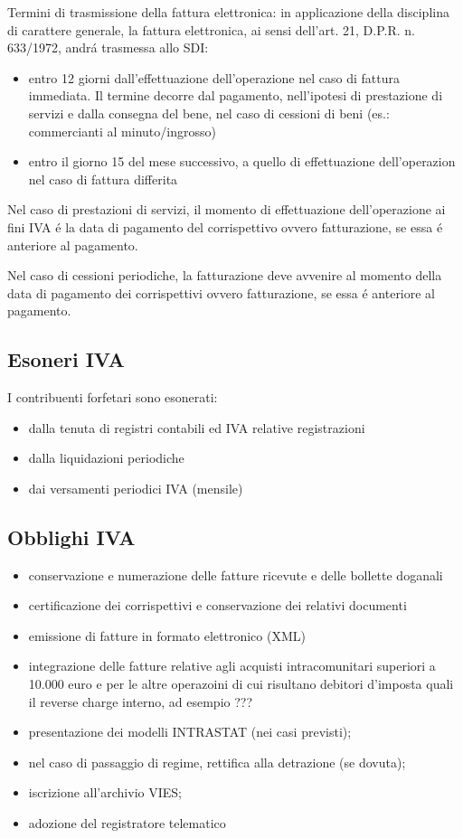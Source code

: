 \documentclass{article}
\begin{document}
Termini di trasmissione della fattura elettronica: in applicazione della disciplina di carattere generale, la fattura elettronica, ai sensi dell'art. 21, D.P.R. n. 633/1972, andr\'a trasmessa allo SDI:

\begin{itemize}
    \item entro 12 giorni dall'effettuazione dell'operazione nel caso di fattura immediata. Il termine decorre dal pagamento, nell'ipotesi di prestazione di servizi e dalla consegna del bene, nel caso di cessioni di beni (es.: commercianti al minuto/ingrosso)
    \item entro il giorno 15 del mese successivo, a quello di effettuazione dell'operazion nel caso di fattura differita
\end{itemize}

Nel caso di prestazioni di servizi, il momento di effettuazione dell'operazione ai fini IVA \'e la data di pagamento del corrispettivo ovvero fatturazione, se essa \'e anteriore al pagamento.

Nel caso di cessioni periodiche, la fatturazione deve avvenire al momento della data di pagamento dei corrispettivi ovvero fatturazione, se essa \'e anteriore al pagamento.

\subsection{Esoneri IVA}
I contribuenti forfetari sono esonerati:
\begin{itemize}
    \item dalla tenuta di registri contabili ed IVA relative registrazioni
    \item dalla liquidazioni periodiche
    \item dai versamenti periodici IVA (mensile)
\end{itemize}

\subsection{Obblighi IVA}
\begin{itemize}
    \item conservazione e numerazione delle fatture ricevute e delle bollette doganali
    \item certificazione dei corrispettivi e conservazione dei relativi documenti
    \item emissione di fatture in formato elettronico (XML)
    \item integrazione delle fatture relative agli acquisti intracomunitari superiori a 10.000 euro e per le altre operazoini di cui risultano debitori d'imposta quali il reverse charge interno, ad esempio ???

    \item presentazione dei modelli INTRASTAT (nei casi previsti);
    \item nel caso di passaggio di regime, rettifica alla detrazione (se dovuta);
    \item iscrizione all'archivio VIES;
    \item adozione del registratore telematico
\end{itemize}
\end{document}
